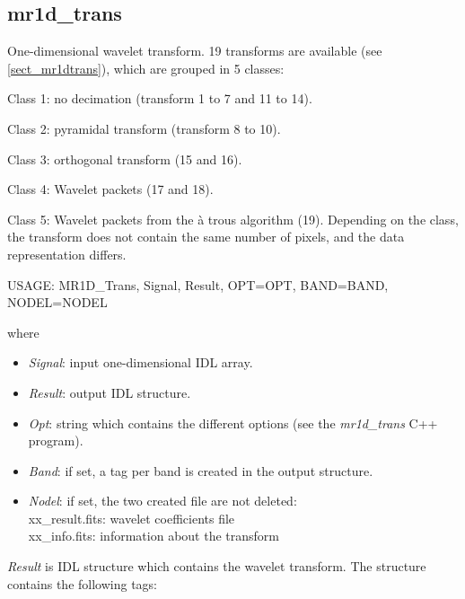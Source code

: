 \subsection{mr1d\_trans}
One-dimensional wavelet transform. 19 transforms are available
 (see \ref{sect_mr1dtrans}), which are grouped in 5 classes:
\bi
\item Class 1: no decimation (transform 1 to 7 and 11 to 14).
\item Class 2: pyramidal transform (transform 8 to 10).
\item Class 3: orthogonal transform (15 and 16).
\item Class 4: Wavelet packets (17 and 18).
\item Class 5: Wavelet packets from the \`a trous algorithm  (19).
\ei
Depending on the class, the transform does not contain the
same number of pixels, and the data representation differs.
{\bf
\begin{center}
     USAGE: MR1D\_Trans, Signal, Result, OPT=OPT, BAND=BAND, NODEL=NODEL 
\end{center}}
where 
\begin{itemize}
\item {\em Signal}: input one-dimensional IDL array.
\item {\em Result}: output IDL structure.
\item {\em Opt}: string which contains the different options 
(see the {\em mr1d\_trans} C++  program).
\item {\em Band}: if set, a tag per band is created in the output structure.
\item {\em Nodel}: if set, the two created file are not deleted: \\
xx\_result.fits: wavelet coefficients file  \\
xx\_info.fits: information about the transform
\end{itemize}
{\em Result} is IDL structure which contains the wavelet transform.
The structure contains the following tags:

